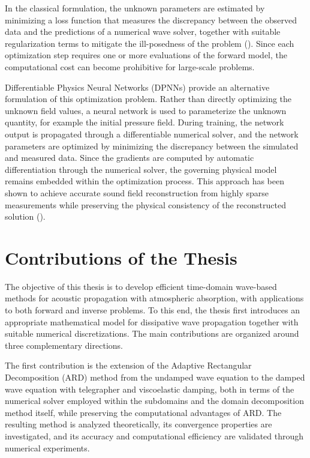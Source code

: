 \documentclass{Configuration_Files/PoliMi3i_thesis}
\begin{document}
In the classical formulation, the unknown parameters are estimated by minimizing a loss function that measures the discrepancy between the observed data and the predictions of a numerical wave solver, together with suitable regularization terms to mitigate the ill-posedness of the problem (\cite{bi_sound_2019}). Since each optimization step requires one or more evaluations of the forward model, the computational cost can become prohibitive for large-scale problems.

Differentiable Physics Neural Networks (DPNNs) provide an alternative formulation of this optimization problem. Rather than directly optimizing the unknown field values, a neural network is used to parameterize the unknown quantity, for example the initial pressure field. During training, the network output is propagated through a differentiable numerical solver, and the network parameters are optimized by minimizing the discrepancy between the simulated and measured data. Since the gradients are computed by automatic differentiation through the numerical solver, the governing physical model remains embedded within the optimization process. This approach has been shown to achieve accurate sound field reconstruction from highly sparse measurements while preserving the physical consistency of the reconstructed solution (\cite{verburg_differentiable_2025}).
%
\section{Contributions of the Thesis}
The objective of this thesis is to develop efficient time-domain wave-based methods for acoustic propagation with atmospheric absorption, with applications to both forward and inverse problems. To this end, the thesis first introduces an appropriate mathematical model for dissipative wave propagation together with suitable numerical discretizations. The main contributions are organized around three complementary directions.

The first contribution is the extension of the Adaptive Rectangular Decomposition (ARD) method from the undamped wave equation to the damped wave equation with telegrapher and viscoelastic damping, both in terms of the numerical solver employed within the subdomains and the domain decomposition method itself, while preserving the computational advantages of ARD. The resulting method is analyzed theoretically, its convergence properties are investigated, and its accuracy and computational efficiency are validated through numerical experiments.
\end{document}
